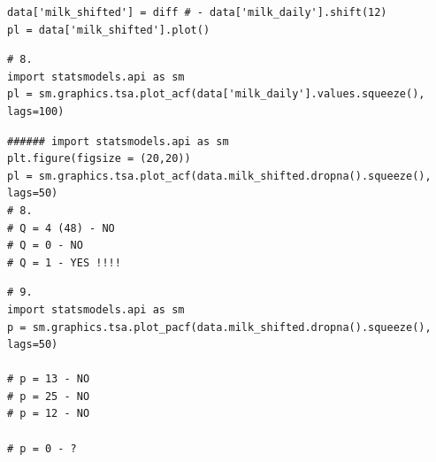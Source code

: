 \documentclass[11pt,a4paper]{article}
\begin{document}
\begin{verbatim}
data['milk_shifted'] = diff # - data['milk_daily'].shift(12)
pl = data['milk_shifted'].plot()
\end{verbatim}

\begin{verbatim}
# 8.
import statsmodels.api as sm
pl = sm.graphics.tsa.plot_acf(data['milk_daily'].values.squeeze(), lags=100)
\end{verbatim}

\begin{verbatim}
###### import statsmodels.api as sm
plt.figure(figsize = (20,20))
pl = sm.graphics.tsa.plot_acf(data.milk_shifted.dropna().squeeze(), lags=50)
# 8.
# Q = 4 (48) - NO
# Q = 0 - NO
# Q = 1 - YES !!!!
\end{verbatim}

\begin{verbatim}
# 9.
import statsmodels.api as sm
p = sm.graphics.tsa.plot_pacf(data.milk_shifted.dropna().squeeze(), lags=50)

# p = 13 - NO
# p = 25 - NO
# p = 12 - NO

# p = 0 - ?
\end{verbatim}
\end{document}
